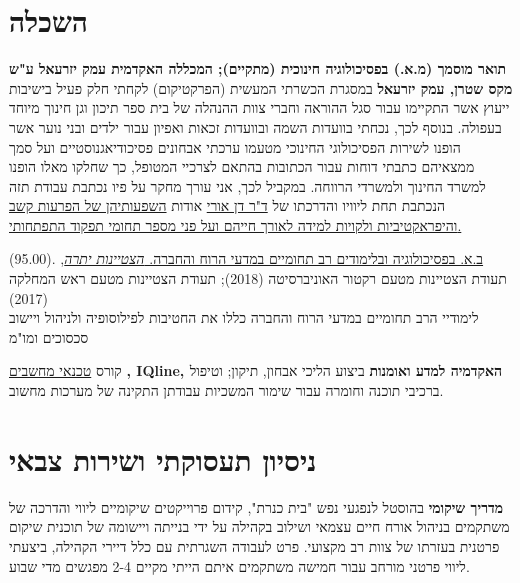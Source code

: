 \section{השכלה}

{\textbf{תואר מוסמך (מ.א.) בפסיכולוגיה חינוכית (מתקיים); המכללה האקדמית עמק יזרעאל ע"ש מקס שטרן, עמק יזרעאל}}
{במסגרת הכשרתי המעשית (הפרקטיקום) לקחתי חלק פעיל בישיבות ייעוץ אשר התקיימו עבור סגל ההוראה וחברי צוות ההנהלה של בית ספר תיכון וגן חינוך מיוחד בעפולה. בנוסף לכך, נכחתי בוועדות השמה ובוועדות זכאות ואפיון עבור ילדים ובני נוער אשר הופנו לשירות הפסיכולוגי החינוכי מטעמו  ערכתי אבחונים פסיכודיאגנוסטיים ועל סמך ממצאיהם כתבתי דוחות עבור הכתובות בהתאם לצרכיי המטופל, כך שחלקו מאלו הופנו למשרד החינוך ולמשרדי הרווחה. במקביל לכך, אני עורך מחקר על פיו נכתבת עבודת תזה הנכתבת תחת ליוויו והדרכתו של 
	\href{https://www.researchgate.net/scientific-contributions/Orrie-Dan-2172412162}{ד"ר דן אורי} אודות 
	\href{https://tinyurl.com/ADHD-Coping-Seminar}{השפעותיהן של הפרעות קשב והיפראקטיביות ולקויות למידה לאורך חייהם ועל פני מספר תחומי תפקוד התפתחותי.}}
{}

{\href{https://www.dropbox.com/s/pcm0mybvgi85ma0/BA-Psych.pdf}{ב.א. בפסיכולוגיה ובלימודים רב תחומיים במדעי הרוח והחברה. \textit{הצטיינות יתרה}}, .(95.00)}
{תעודת הצטיינות מטעם רקטור האוניברסיטה (2018); תעודת הצטיינות מטעם ראש המחלקה (2017)\\
לימודיי הרב תחומיים במדעי הרוח והחברה כללו את החטיבות לפילוסופיה ולניהול ויישוב סכסוכים ומו"מ}
{}

\par{\par}

 {קורס
\href{https://www.dropbox.com/s/csphxdynjdg3ze2/computer-technitian-certificate.jpg}{טכנאי מחשבים}
		\textbf{, IQline, האקדמיה למדע ואומנות}}
{ביצוע הליכי אבחון, תיקון; וטיפול ברכיבי תוכנה וחומרה עבור שימור המשכיות עבודתן התקינה של מערכות מחשוב.}
{}
{}

\section{ניסיון תעסוקתי ושירות צבאי}

{\textbf{מדריך שיקומי}  בהוסטל לנפגעי נפש "בית כנרת", קידום פרוייקטים שיקומיים}
{ליווי והדרכה של משתקמים בניהול אורח חיים עצמאי ושילוב בקהילה על ידי בנייתה ויישומה של תוכנית שיקום פרטנית בעזרתו של צוות רב מקצועי. פרט לעבודה השגרתית עם כלל דיירי הקהילה, ביצעתי ליווי פרטני מורחב עבור חמישה משתקמים איתם הייתי מקיים 2-4 מפגשים מדי שבוע.}
{}

